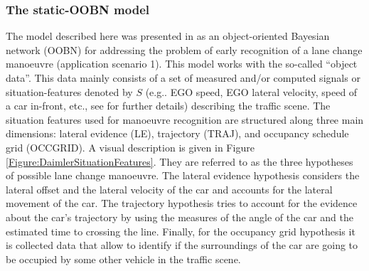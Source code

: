 \subsubsection*{The static-OOBN model}

The model described here was presented in \cite{kasper2012object} as an object-oriented Bayesian network  (OOBN) \cite{koller1997object} for addressing the problem of early recognition of a lane change manoeuvre (application scenario 1).  This model works with the so-called ``object data''. This data mainly consists of a set of measured and/or computed signals or situation-features denoted by $S$ (e.g.. EGO speed, EGO lateral velocity, speed of a car in-front, etc., see \cite{kasper2012object} for further details) describing the traffic scene. The situation features used for manoeuvre recognition are structured along three main dimensions: lateral evidence (LE), trajectory (TRAJ), and occupancy schedule grid (OCCGRID).  A visual description is given in Figure \ref{Figure:DaimlerSituationFeatures}. They are referred to as the three hypotheses of possible lane change manoeuvre. The lateral evidence hypothesis considers the lateral offset and the lateral velocity of the car and accounts for the lateral movement of the car. The trajectory hypothesis tries to account for the evidence about the car's trajectory by using the measures of the angle of the car and the estimated time to crossing the line. Finally, for the occupancy grid hypothesis it is collected data that allow to identify if the surroundings of the car are going to be occupied by some other vehicle in the traffic scene. 

